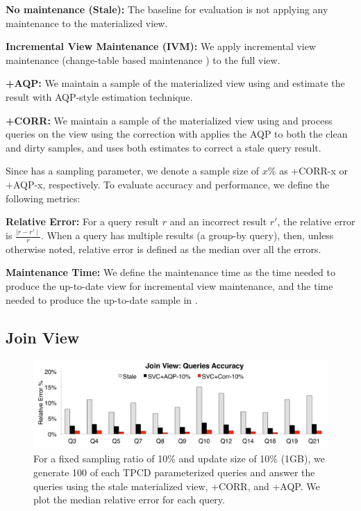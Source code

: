 \noindent\textbf{No maintenance (Stale): } The baseline for evaluation is not applying any maintenance to the materialized view.

\noindent\textbf{Incremental View Maintenance (IVM): } We apply incremental view maintenance (change-table based maintenance \cite{gupta2006incremental}) to the full view.

\noindent\textbf{\svcnospace+AQP: } We maintain a sample of the materialized view using \svc and estimate the result with AQP-style estimation technique. 

\noindent\textbf{\svcnospace+CORR: } We maintain a sample of the materialized view using \svc and process queries on the view using the correction with applies the AQP to both the clean and dirty samples, and uses both estimates to correct a stale query result.

\vspace{0.5em}
Since \svc has a sampling parameter, we denote a sample size of $x \% $ as \svcnospace+CORR-x or \svcnospace+AQP-x, respectively. 
To evaluate accuracy and performance, we define the following metrics:

\noindent\textbf{Relative Error: } For a query result $r$ and an incorrect result $r'$, the relative error is $\frac{\mid r-r' \mid}{r}.$
When a query has multiple results (a group-by query), then, unless otherwise noted, relative error is defined as the median over all the errors.

\noindent\textbf{Maintenance Time: } We define the maintenance time as the time needed to produce the up-to-date view for incremental view maintenance, and the time needed to produce the up-to-date sample in \svc. 

\subsection{Join View}

\begin{figure}[t]
\centering
\includegraphics[scale=0.14]{exp/msj_3.pdf}\vspace{-.5em}
 \caption{For a fixed sampling ratio of 10\% and update size of 10\% (1GB), we generate 100 of each TPCD parameterized queries and answer the queries using the stale materialized view, \svcnospace+CORR, and \svcnospace+AQP. We plot the median relative error for each query.\label{exp-1-acc}}\vspace{-1em}
\end{figure}

